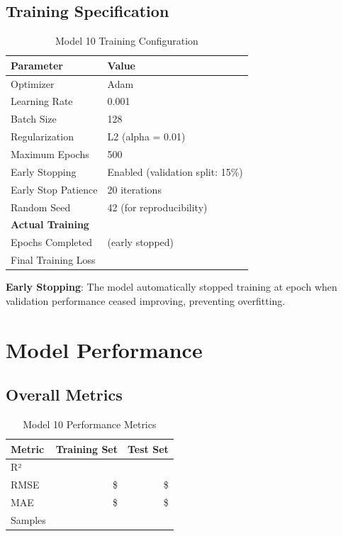\subsection{Training Specification}

\begin{table}[h]
\centering
\caption{Model 10 Training Configuration}
\begin{tabular}{ll}
\toprule
\textbf{Parameter} & \textbf{Value} \\
\midrule
Optimizer & Adam \\
Learning Rate & 0.001 \\
Batch Size & 128 \\
Regularization & L2 (alpha = 0.01) \\
Maximum Epochs & 500 \\
Early Stopping & Enabled (validation split: 15\%) \\
Early Stop Patience & 20 iterations \\
Random Seed & 42 (for reproducibility) \\
\midrule
\textbf{Actual Training} & \\
Epochs Completed & \ModelTenEpochsStopped{} (early stopped) \\
Final Training Loss & \ModelTenTrainingLoss{} \\
\bottomrule
\end{tabular}
\end{table}

\textbf{Early Stopping}: The model automatically stopped training at epoch \ModelTenEpochsStopped{} when validation performance ceased improving, preventing overfitting.

\section{Model Performance}

\subsection{Overall Metrics}

\begin{table}[h]
\centering
\caption{Model 10 Performance Metrics}
\begin{tabular}{lrr}
\toprule
\textbf{Metric} & \textbf{Training Set} & \textbf{Test Set} \\
\midrule
R² & \ModelTenRSquaredTrain{} & \ModelTenRSquaredTest{} \\
RMSE & \$\ModelTenRMSETrain{} & \$\ModelTenRMSETest{} \\
MAE & \$\ModelTenMAETrain{} & \$\ModelTenMAETest{} \\
Samples & \ModelTenTrainingSamples{} & \ModelTenTestSamples{} \\
\bottomrule
\end{tabular}
\end{table}

